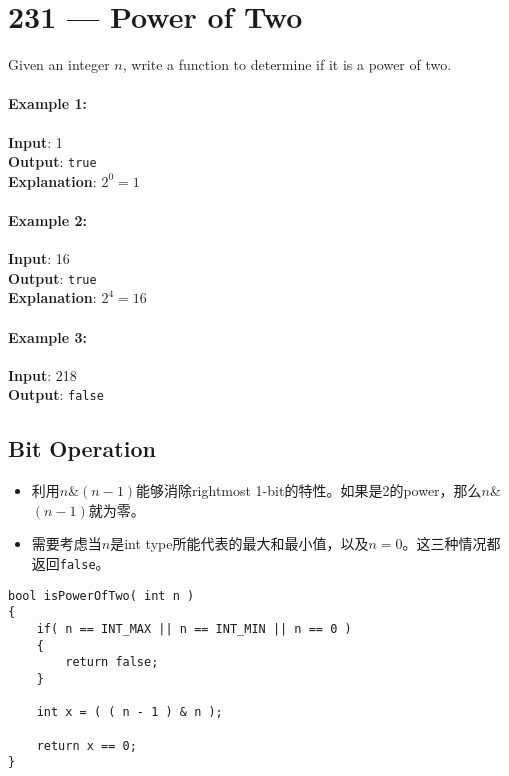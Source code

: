 \section{231 --- Power of Two}
Given an integer $n$, write a function to determine if it is a power of two.

\paragraph{Example 1:}

\begin{flushleft}
\textbf{Input}: 1
\\
\textbf{Output}: \texttt{true} 
\\
\textbf{Explanation}: $2^0 = 1$
\end{flushleft}


\paragraph{Example 2:}

\begin{flushleft}
\textbf{Input}: 16
\\
\textbf{Output}: \texttt{true}
\\
\textbf{Explanation}: $2^4 = 16$
\end{flushleft}

\paragraph{Example 3:}
\begin{flushleft}
\textbf{Input}: 218
\\
\textbf{Output}: \texttt{false}
\end{flushleft}
\subsection{Bit Operation}
\begin{CJK*}{UTF8}{gbsn}
\begin{itemize}
\item 利用$n$\&$(n-1)$能够消除rightmost 1-bit的特性。如果是2的power，那么$n$\&$(n-1)$就为零。
\item 需要考虑当$n$是int type所能代表的最大和最小值，以及$n=0$。这三种情况都返回\texttt{false}。
\end{itemize}
\end{CJK*}
\setcounter{lstlisting}{0}
\begin{lstlisting}[style=customc, caption={Bit Operation}]
bool isPowerOfTwo( int n )
{
    if( n == INT_MAX || n == INT_MIN || n == 0 )
    {
        return false;
    }

    int x = ( ( n - 1 ) & n );

    return x == 0;
}
\end{lstlisting}
